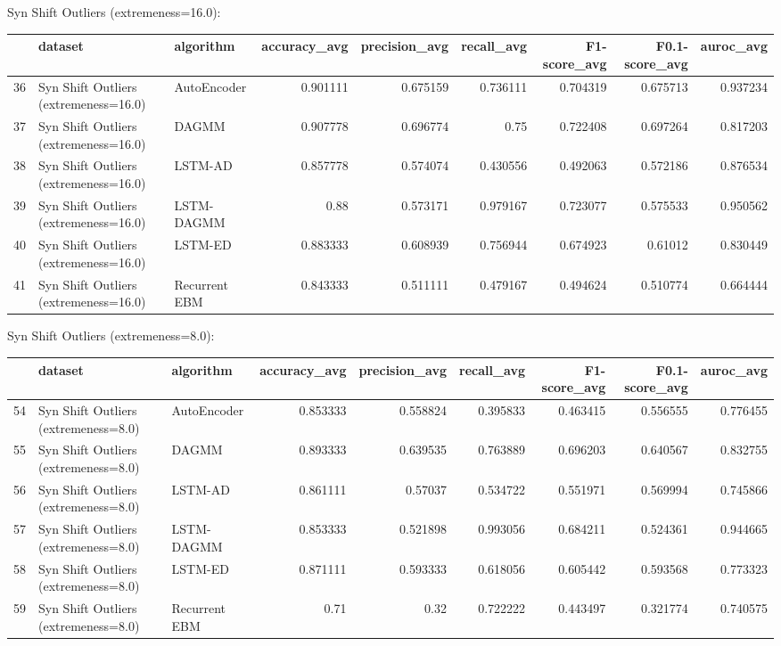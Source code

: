 Syn Shift Outliers (extremeness=16.0):

\begin{tabular}{rllrrrrrr}
\hline
    & dataset                               & algorithm     &   accuracy\_avg &   precision\_avg &   recall\_avg &   F1-score\_avg &   F0.1-score\_avg &   auroc\_avg \\
\hline
 36 & Syn Shift Outliers (extremeness=16.0) & AutoEncoder   &       0.901111 &        0.675159 &     0.736111 &       0.704319 &         0.675713 &    0.937234 \\
 37 & Syn Shift Outliers (extremeness=16.0) & DAGMM         &       0.907778 &        0.696774 &     0.75     &       0.722408 &         0.697264 &    0.817203 \\
 38 & Syn Shift Outliers (extremeness=16.0) & LSTM-AD       &       0.857778 &        0.574074 &     0.430556 &       0.492063 &         0.572186 &    0.876534 \\
 39 & Syn Shift Outliers (extremeness=16.0) & LSTM-DAGMM    &       0.88     &        0.573171 &     0.979167 &       0.723077 &         0.575533 &    0.950562 \\
 40 & Syn Shift Outliers (extremeness=16.0) & LSTM-ED       &       0.883333 &        0.608939 &     0.756944 &       0.674923 &         0.61012  &    0.830449 \\
 41 & Syn Shift Outliers (extremeness=16.0) & Recurrent EBM &       0.843333 &        0.511111 &     0.479167 &       0.494624 &         0.510774 &    0.664444 \\
\hline
\end{tabular}

Syn Shift Outliers (extremeness=8.0):

\begin{tabular}{rllrrrrrr}
\hline
    & dataset                              & algorithm     &   accuracy\_avg &   precision\_avg &   recall\_avg &   F1-score\_avg &   F0.1-score\_avg &   auroc\_avg \\
\hline
 54 & Syn Shift Outliers (extremeness=8.0) & AutoEncoder   &       0.853333 &        0.558824 &     0.395833 &       0.463415 &         0.556555 &    0.776455 \\
 55 & Syn Shift Outliers (extremeness=8.0) & DAGMM         &       0.893333 &        0.639535 &     0.763889 &       0.696203 &         0.640567 &    0.832755 \\
 56 & Syn Shift Outliers (extremeness=8.0) & LSTM-AD       &       0.861111 &        0.57037  &     0.534722 &       0.551971 &         0.569994 &    0.745866 \\
 57 & Syn Shift Outliers (extremeness=8.0) & LSTM-DAGMM    &       0.853333 &        0.521898 &     0.993056 &       0.684211 &         0.524361 &    0.944665 \\
 58 & Syn Shift Outliers (extremeness=8.0) & LSTM-ED       &       0.871111 &        0.593333 &     0.618056 &       0.605442 &         0.593568 &    0.773323 \\
 59 & Syn Shift Outliers (extremeness=8.0) & Recurrent EBM &       0.71     &        0.32     &     0.722222 &       0.443497 &         0.321774 &    0.740575 \\
\hline
\end{tabular}

